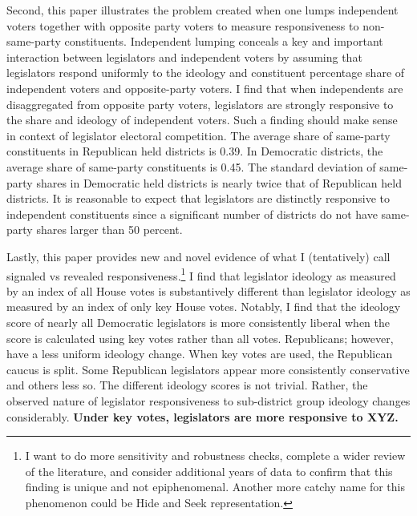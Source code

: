 \documentclass[10pt,letterpaper]{article}
\begin{document}
Second, this paper illustrates the problem created when one lumps independent voters together with opposite party voters to measure responsiveness to non-same-party constituents. Independent lumping conceals a key and important interaction between legislators and independent voters by assuming that legislators respond uniformly to the ideology and constituent percentage share of independent voters and opposite-party voters. I find that when independents are disaggregated from opposite party voters, legislators are strongly responsive to the share and ideology of independent voters. Such a finding should make sense in context of legislator electoral competition. The average share of same-party constituents in Republican held districts is 0.39. In Democratic districts, the average share of same-party constituents is 0.45. The standard deviation of same-party shares in Democratic held districts is nearly twice that of Republican held districts. It is reasonable to expect that legislators are distinctly responsive to independent constituents since a significant number of districts do not have same-party shares larger than 50 percent.

Lastly, this paper provides new and novel evidence of what I (tentatively) call signaled vs revealed responsiveness.\footnote{I want to do more sensitivity and robustness checks, complete a wider review of the literature, and consider additional years of data to confirm that this finding is unique and not epiphenomenal. Another more catchy name for this phenomenon could be Hide and Seek representation.} I find that legislator ideology as measured by an index of all House votes is substantively different than legislator ideology as measured by an index of only key House votes. Notably, I find that the ideology score of nearly all Democratic legislators is more consistently liberal when the score is calculated using key votes rather than all votes. Republicans; however, have a less uniform ideology change. When key votes are used, the Republican caucus is split. Some Republican legislators appear more consistently conservative and others less so. The different ideology scores is not trivial. Rather, the observed nature of legislator responsiveness to sub-district group ideology changes considerably. \textbf{Under key votes, legislators are more responsive to XYZ.}
\end{document}
